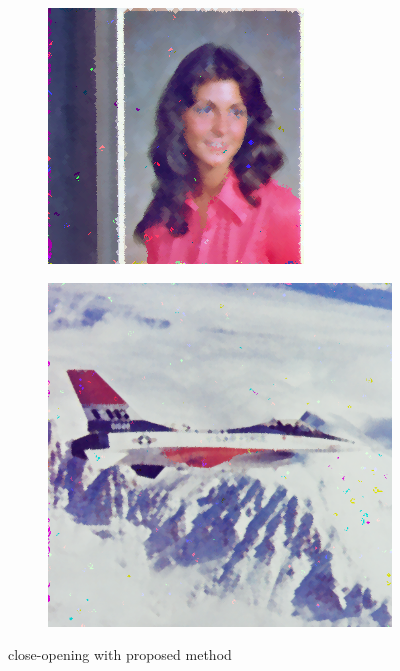 \begin{subfigure}{0.9\textwidth}
\begin{subfigure}[t]{0.15\textwidth}
    \centering
  \end{subfigure}
\begin{subfigure}[t]{0.15\textwidth}
    \includegraphics[width=0.9\linewidth]{../images/outputs/denoise/co/co4.png}
    
    \centering
  \end{subfigure}
\begin{subfigure}[t]{0.15\textwidth}
    \includegraphics[width=0.9\linewidth]{../images/outputs/denoise/co/co5.png}
    
    \centering
  \end{subfigure}
 \caption{close-opening with proposed method}
 \end{subfigure}
